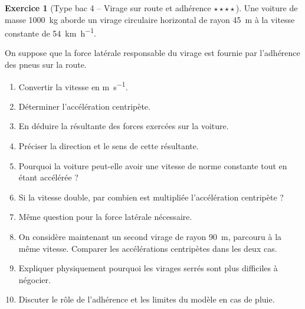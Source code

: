 \documentclass[11pt,a4paper]{article}
\theoremstyle{definition}
\newtheorem{exercice}{Exercice}[section]
\newcommand{\etoiles}[1]{\hfill{\small\textbf{#1}}}
\begin{document}
\begin{exercice}[Type bac 4 -- Virage sur route et adhérence \etoiles{$\star\star\star\star$}]
Une voiture de masse \SI{1000}{kg} aborde un virage circulaire horizontal de rayon \SI{45}{m}
à la vitesse constante de \SI{54}{km.h^{-1}}.

On suppose que la force latérale responsable du virage est fournie par l’adhérence des pneus sur la route.

\begin{enumerate}[label=\arabic*.]
    \item Convertir la vitesse en \si{m.s^{-1}}.
    \item Déterminer l’accélération centripète.
    \item En déduire la résultante des forces exercées sur la voiture.
    \item Préciser la direction et le sens de cette résultante.
    \item Pourquoi la voiture peut-elle avoir une vitesse de norme constante tout en étant accélérée ?
    \item Si la vitesse double, par combien est multipliée l’accélération centripète ?
    \item Même question pour la force latérale nécessaire.
    \item On considère maintenant un second virage de rayon \SI{90}{m}, parcouru à la même vitesse.
    Comparer les accélérations centripètes dans les deux cas.
    \item Expliquer physiquement pourquoi les virages serrés sont plus difficiles à négocier.
    \item Discuter le rôle de l’adhérence et les limites du modèle en cas de pluie.
\end{enumerate}
\end{exercice}
\end{document}
